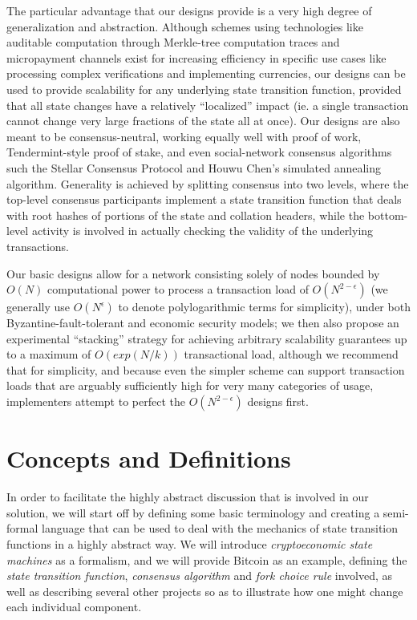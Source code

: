 \documentclass[11pt,a4paper]{article}
\theoremstyle{plain}
\theoremstyle{definition}
\theoremstyle{remark}
\begin{document}
The particular advantage that our designs provide is a very high degree of generalization and abstraction. Although schemes using technologies like auditable computation through Merkle-tree computation traces\cite{versum} and micropayment channels\cite{lightning} exist for increasing efficiency in specific use cases like processing complex verifications and implementing currencies, our designs can be used to provide scalability for any underlying state transition function, provided that all state changes have a relatively ``localized'' impact (ie. a single transaction cannot change very large fractions of the state all at once). Our designs are also meant to be consensus-neutral, working equally well with proof of work, Tendermint-style\cite{tendermint} proof of stake, and even social-network consensus algorithms such the Stellar Consensus Protocol\cite{stellar} and Houwu Chen's simulated annealing algorithm\cite{chenhouwu}. Generality is achieved by splitting consensus into two levels, where the top-level consensus participants implement a state transition function that deals with root hashes of portions of the state and collation headers, while the bottom-level activity is involved in actually checking the validity of the underlying transactions.

Our basic designs allow for a network consisting solely of nodes bounded by $O(N)$ computational power to process a transaction load of $O(N^{2-\epsilon})$ (we generally use $O(N^\epsilon)$ to denote polylogarithmic terms for simplicity), under both Byzantine-fault-tolerant and economic security models; we then also propose an experimental ``stacking'' strategy for achieving arbitrary scalability guarantees up to a maximum of $O(exp(N/k))$ transactional load, although we recommend that for simplicity, and because even the simpler scheme can support transaction loads that are arguably sufficiently high for very many categories of usage, implementers attempt to perfect the $O(N^{2-\epsilon})$ designs first.

\section{Concepts and Definitions}

In order to facilitate the highly abstract discussion that is involved in our solution, we will start off by defining some basic terminology and creating a semi-formal language that can be used to deal with the mechanics of state transition functions in a highly abstract way. We will introduce \emph{cryptoeconomic state machines} as a formalism, and we will provide Bitcoin as an example, defining the \emph{state transition function}, \emph{consensus algorithm} and \emph{fork choice rule} involved, as well as describing several other projects so as to illustrate how one might change each individual component.
\end{document}
